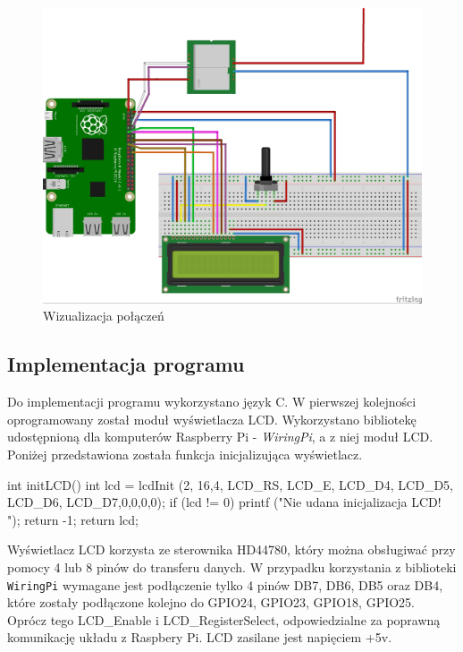\documentclass{article}
\begin{document}
			
			\begin{figure}[H]
				\centering
				\includegraphics[width=0.9\linewidth]{schemat-podlaczenia_bb.jpg}
				\caption{Wizualizacja połączeń}
			\end{figure}
			
	\subsection{Implementacja programu}
		Do implementacji programu wykorzystano język C. W pierwszej kolejności oprogramowany został moduł wyświetlacza LCD. Wykorzystano bibliotekę udostępnioną dla komputerów Raspberry Pi - \textit{WiringPi}, a z niej moduł LCD. Poniżej przedstawiona została funkcja inicjalizująca wyświetlacz.
		\begin{verbatimtab}[4]
	int initLCD(){
		int lcd = lcdInit (2, 16,4, LCD_RS, LCD_E, LCD_D4, LCD_D5, LCD_D6, LCD_D7,0,0,0,0);
		if (lcd != 0){
			printf ("Nie udana inicjalizacja LCD! \n");
			return -1;
		}
		return lcd;
	}
		\end{verbatimtab}
		Wyświetlacz LCD korzysta ze sterownika HD44780, który można obsługiwać przy pomocy 4 lub 8 pinów do transferu danych. W przypadku korzystania z biblioteki \texttt{WiringPi} wymagane jest podłączenie tylko 4 pinów DB7, DB6, DB5 oraz DB4, które zostały podłączone kolejno do GPIO24, GPIO23, GPIO18, GPIO25. Oprócz tego LCD\_Enable i LCD\_RegisterSelect, odpowiedzialne za poprawną komunikację układu z Raspbery Pi. LCD zasilane jest napięciem +5v.
\end{document}
